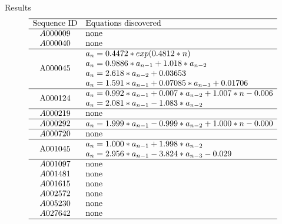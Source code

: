 \documentclass[t,usenames,dvipsnames]{beamer} %
\newcommand{\1}{\boldsymbol{1}}
\newcommand{\0}{\boldsymbol{0}}
\begin{document}
\begin{frame}{Results}
    \scriptsize
$$    \begin{array}{cl}
\hline
    \text{Sequence ID} & \text{Equations discovered} \\
\hline
    A000009 
& \text{none} \\
    A000040 &  \text{none}   \\
\hline
    \multirow{4}{*}{A000045} & a_n = 0.4472*exp(0.4812*n)  \\
    & a_n = 0.9886*a_{n-1} + 1.018*a_{n-2} \\
    & a_n = 2.618*a_{n-2} + 0.03653 \\
    & a_n = 1.591*a_{n-1} + 0.07085*a_{n-3} + 0.01706   \\
\hline
    \multirow{2}{*}{A000124} & a_n =   0.992*a_{n-1} + 0.007*a_{n-2} + 1.007*n - 0.006 \\
    & a_n =   2.081*a_{n-1} - 1.083*a_{n-2} \\
\hline
    A000219 &  \text{none} \\
\hline
    A000292 & a_n =  1.999*a_{n-1} - 0.999*a_{n-2} + 1.000*n -  0.000 \\
\hline
    A000720 & \text{none} \\
\hline
    \multirow{2}{*}{A001045} & a_n =   1.000*a_{n-1} + 1.998*a_{n-2} \\
    & a_n =   2.956*a_{n-1} - 3.824*a_{n-3} - 0.029        \\
\hline
    A001097 & \text{none} \\
    A001481 & \text{none} \\
    A001615 & \text{none} \\
    A002572 & \text{none} \\
    A005230 & \text{none} \\
    A027642 & \text{none} \\
\hline
\end{array}$$

\end{frame}
\end{document}
